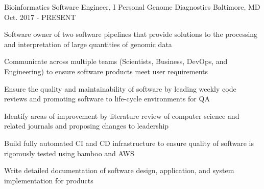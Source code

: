 

\begin{cventries}

  \cventry
    {Bioinformatics Software Engineer, I} %
    {Personal Genome Diagnostics} %
    {Baltimore, MD} %
    {Oct. 2017 - PRESENT} %
    {
      \begin{cvitems} %
        \item{Software owner of two software pipelines that provide solutions to the processing and interpretation of large quantities of genomic data}
        \item{Communicate across multiple teams (Scientists, Business, DevOps, and Engineering) to ensure software products meet user requirements}
        \item{Ensure the quality and maintainability of software by leading weekly code reviews and promoting software to life-cycle environments for QA}
        \item{Identify areas of improvement by literature review of computer science and related journals and proposing changes to leadership}
        \item{Build fully automated CI and CD infrastructure to ensure quality of software is rigorously tested using bamboo and AWS }
        \item{Write detailed documentation of software design, application, and system implementation for products}
      \end{cvitems}
    }


\end{cventries}
